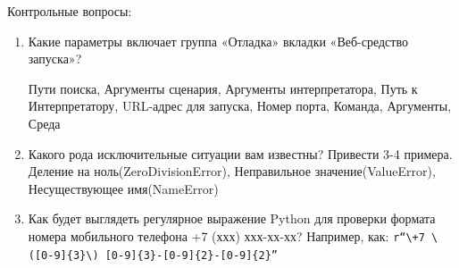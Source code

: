 \documentclass[14pt]{extarticle}
\begin{document}
Контрольные вопросы:
\begin{enumerate}
\item Какие параметры включает группа «Отладка» вкладки «Веб-средство запуска»?

Пути поиска, Аргументы сценария, Аргументы интерпретатора, Путь к
Интерпретатору, URL-адрес для запуска, Номер порта, Команда, Аргументы, Среда
\item Какого рода исключительные ситуации вам известны? Привести 3-4 примера.
Деление на ноль(ZeroDivisionError), Неправильное значение(ValueError), Несуществующее имя(NameError)
\item Как будет выглядеть регулярное выражение Python для проверки формата номера мобильного телефона +7 (ххх) ххх-хх-хх?
Например, как: \texttt{r“\textbackslash{}+7 \textbackslash{}([0-9]\{3\}\textbackslash{}) [0-9]\{3\}-[0-9]\{2\}-[0-9]\{2\}”}
\end{enumerate}
\end{document}
